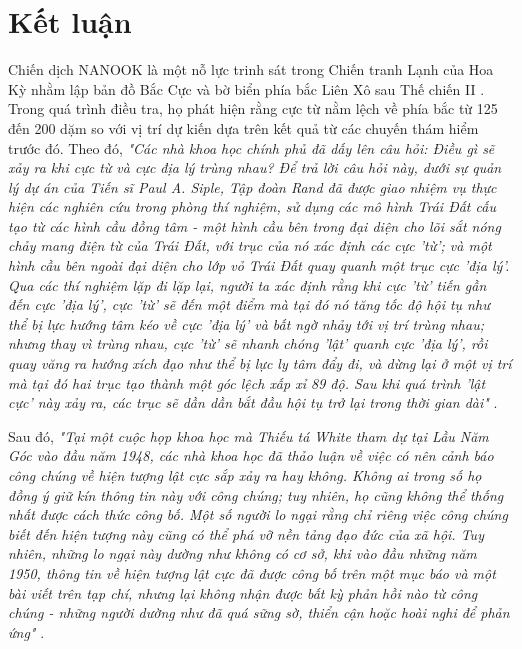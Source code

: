 \documentclass[10pt,twocolumn,letterpaper]{article}
\begin{document}
\section{Kết luận}

Chiến dịch NANOOK là một nỗ lực trinh sát trong Chiến tranh Lạnh của Hoa Kỳ nhằm lập bản đồ Bắc Cực và bờ biển phía bắc Liên Xô sau Thế chiến II \cite{137}. Trong quá trình điều tra, họ phát hiện rằng cực từ nằm lệch về phía bắc từ 125 đến 200 dặm so với vị trí dự kiến dựa trên kết quả từ các chuyến thám hiểm trước đó. Theo đó, \textit{"Các nhà khoa học chính phủ đã dấy lên câu hỏi: Điều gì sẽ xảy ra khi cực từ và cực địa lý trùng nhau? Để trả lời câu hỏi này, dưới sự quản lý dự án của Tiến sĩ Paul A. Siple, Tập đoàn Rand đã được giao nhiệm vụ thực hiện các nghiên cứu trong phòng thí nghiệm, sử dụng các mô hình Trái Đất cấu tạo từ các hình cầu đồng tâm - một hình cầu bên trong đại diện cho lõi sắt nóng chảy mang điện từ của Trái Đất, với trục của nó xác định các cực 'từ'; và một hình cầu bên ngoài đại diện cho lớp vỏ Trái Đất quay quanh một trục cực 'địa lý'. Qua các thí nghiệm lặp đi lặp lại, người ta xác định rằng khi cực 'từ' tiến gần đến cực 'địa lý', cực 'từ' sẽ đến một điểm mà tại đó nó tăng tốc độ hội tụ như thể bị lực hướng tâm kéo về cực 'địa lý' và bất ngờ nhảy tới vị trí trùng nhau; nhưng thay vì trùng nhau, cực 'từ' sẽ nhanh chóng 'lật' quanh cực 'địa lý', rồi quay văng ra hướng xích đạo như thể bị lực ly tâm đẩy đi, và dừng lại ở một vị trí mà tại đó hai trục tạo thành một góc lệch xấp xỉ 89 độ. Sau khi quá trình 'lật cực' này xảy ra, các trục sẽ dần dần bắt đầu hội tụ trở lại trong thời gian dài"} \cite{138,139}.

Sau đó, \textit{"Tại một cuộc họp khoa học mà Thiếu tá White tham dự tại Lầu Năm Góc vào đầu năm 1948, các nhà khoa học đã thảo luận về việc có nên cảnh báo công chúng về hiện tượng lật cực sắp xảy ra hay không. Không ai trong số họ đồng ý giữ kín thông tin này với công chúng; tuy nhiên, họ cũng không thể thống nhất được cách thức công bố. Một số người lo ngại rằng chỉ riêng việc công chúng biết đến hiện tượng này cũng có thể phá vỡ nền tảng đạo đức của xã hội. Tuy nhiên, những lo ngại này dường như không có cơ sở, khi vào đầu những năm 1950, thông tin về hiện tượng lật cực đã được công bố trên một mục báo và một bài viết trên tạp chí, nhưng lại không nhận được bất kỳ phản hồi nào từ công chúng - những người dường như đã quá sững sờ, thiển cận hoặc hoài nghi để phản ứng"} \cite{138,139}.
\end{document}
